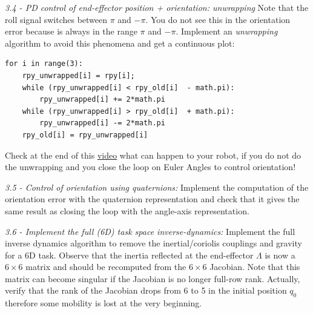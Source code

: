 \documentclass[11pt]{article}
\begin{document}
\textit{3.4 - PD control of end-effector position + orientation: unwrapping}
Note that the roll signal switches between $\pi$ and $-\pi$. You do not see this in the orientation error because is always in the range $\pi$ and $-\pi$. Implement an \textit{unwrapping} algorithm to avoid this phenomena and get a continuous plot:

\begin{verbatim}
for i in range(3):
    rpy_unwrapped[i] = rpy[i];
    while (rpy_unwrapped[i] < rpy_old[i]  - math.pi):
        rpy_unwrapped[i] += 2*math.pi
    while (rpy_unwrapped[i] > rpy_old[i]  + math.pi):  
        rpy_unwrapped[i] -= 2*math.pi
    rpy_old[i] = rpy_unwrapped[i] 	
\end{verbatim}

Check at the end of this \href{https://youtu.be/sax0QzG8qAw }{video} what can happen to your robot, if you do not do the unwrapping and you close the loop on Euler Angles to control orientation! 


\quad

\noindent
\textit{3.5 - Control of orientation using quaternions:}
Implement the computation of the orientation error with the 
quaternion representation and check that it gives the same result as closing the loop with the angle-axis representation. 

\quad
 
\noindent
\textit{3.6 - Implement the full (6D) task space inverse-dynamics:}
Implement the full inverse dynamics algorithm to remove the inertial/coriolis couplings and gravity for a 6D task.
Observe that the inertia reflected at the end-effector $\Lambda$ is now a $6\times6$ matrix and should be recomputed from the $6\times6$ Jacobian. Note that this matrix 
can become singular if the Jacobian is no longer full-row rank. 
Actually, verify that the rank of the Jacobian drops from 6 to 5 in the initial position $q_0$ therefore some mobility is lost 
at the very beginning.
\end{document}
